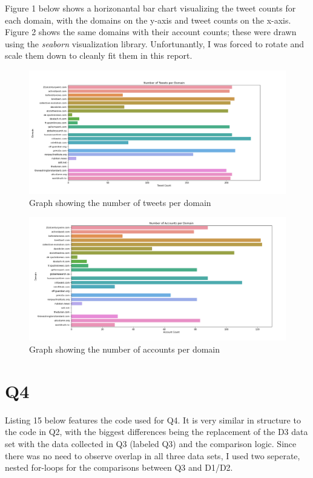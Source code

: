 \documentclass[12pt]{article}
\begin{document}
Figure 1 below shows a horizonantal bar chart visualizing the tweet counts for each domain, with the domains on the y-axis and tweet counts on the x-axis. Figure 2 shows the same domains with their account counts; these were drawn using the \emph{seaborn} visualization library. Unfortunantly, I was forced to rotate and scale them down to cleanly fit them in this report.

\begin{figure}
    \centering
    \includegraphics[scale = .58, trim = 10 17 0 30, clip]{DomainGraph.png}
    \caption{Graph showing the number of tweets per domain}
    \label{fig:my_label}
\end{figure}

\begin{figure}
    \centering
    \includegraphics[scale = .58, trim = 10 17 0 20, clip]{DomainGraphAccounts.png}
    \caption{Graph showing the number of accounts per domain}
    \label{fig:my_label}
\end{figure}

\section*{Q4}

Listing 15 below features the code used for Q4. It is very similar in structure to the code in Q2, with the biggest differences being the replacement of the D3 data set with the data collected in Q3 (labeled Q3) and the comparison logic. Since there was no need to observe overlap in all three data sets, I used two seperate, nested for-loops for the comparisons between Q3 and D1/D2.
\end{document}
